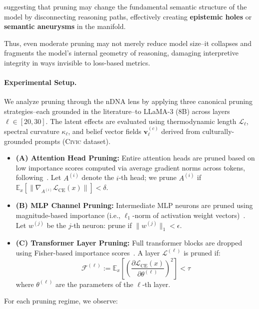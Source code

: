 suggesting that pruning may change the fundamental semantic structure of the model by disconnecting reasoning paths, effectively creating \textbf{epistemic holes} or \textbf{semantic aneurysms} in the manifold.

Thus, even moderate pruning may not merely reduce model size--it collapses and fragments the model’s internal geometry of reasoning, damaging interpretive integrity in ways invisible to loss-based metrics.


\paragraph{Experimental Setup.}
We analyze pruning through the nDNA lens by applying three canonical pruning strategies--each grounded in the literature--to LLaMA-3 (8B) across layers $\ell \in [20,30]$. The latent effects are evaluated using thermodynamic length $\mathcal{L}_\ell$, spectral curvature $\kappa_\ell$, and belief vector fields $\mathbf{v}_\ell^{(c)}$ derived from culturally-grounded prompts (\textsc{Civic} dataset).

\begin{itemize}[leftmargin=1.5em]
    \item \textbf{(A) Attention Head Pruning:} Entire attention heads are pruned based on low importance scores computed via average gradient norms across tokens, following~\citep{michel2019sixteen, voita2019analyzing}. Let $A^{(i)}$ denote the $i$-th head; we prune $A^{(i)}$ if $\mathbb{E}_{x}[\|\nabla_{A^{(i)}} \mathcal{L}_{\text{CE}}(x)\|] < \delta$.
    \item \textbf{(B) MLP Channel Pruning:} Intermediate MLP neurons are pruned using magnitude-based importance (i.e., $\ell_1$-norm of activation weight vectors)~\citep{li2016pruning, he2017channel}. Let $w^{(j)}$ be the $j$-th neuron: prune if $\|w^{(j)}\|_1 < \epsilon$.
    \item \textbf{(C) Transformer Layer Pruning:} Full transformer blocks are dropped using Fisher-based importance scores~\citep{theis2018faster, ganesh2020compressing}. A layer $\mathcal{L}^{(\ell)}$ is pruned if:
    \[
    \mathcal{F}^{(\ell)} := \mathbb{E}_{x} \left[\left(\frac{\partial \mathcal{L}_{\text{CE}}(x)}{\partial \theta^{(\ell)}}\right)^2 \right] < \tau
    \]
    where $\theta^{(\ell)}$ are the parameters of the $\ell$-th layer.
\end{itemize}

For each pruning regime, we observe:

